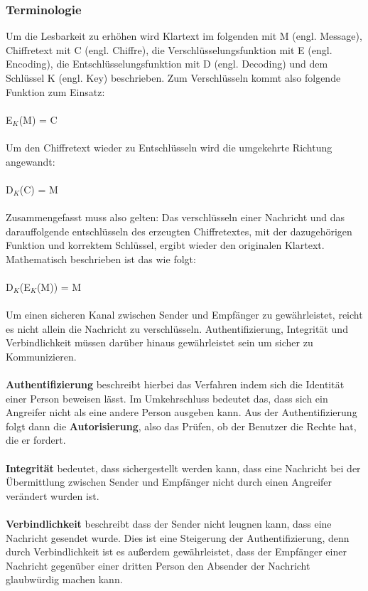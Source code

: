 \documentclass[10pt, a4paper,headsepline]{scrreprt}
\begin{document}
\subsubsection{Terminologie}
Um die Lesbarkeit zu erhöhen wird Klartext im folgenden mit M (engl. Message), Chiffretext mit C (engl. Chiffre), die Verschlüsselungsfunktion mit E (engl. Encoding), die Entschlüsselungsfunktion mit D (engl. Decoding) und dem Schlüssel K (engl. Key) beschrieben.
Zum Verschlüsseln kommt also folgende Funktion zum Einsatz: \\ \\
E$_{K}$(M) = C\\ \\ 
Um den Chiffretext wieder zu Entschlüsseln wird die umgekehrte Richtung angewandt:\\ \\
D$_{K}$(C) = M\\ \\
Zusammengefasst muss also gelten: Das verschlüsseln einer Nachricht und das darauffolgende entschlüsseln des erzeugten Chiffretextes, mit der dazugehörigen Funktion und korrektem Schlüssel, ergibt wieder den originalen Klartext. Mathematisch beschrieben ist das wie folgt:\\ \\
D$_{K}$(E$_{K}$(M)) = M\\ \\
Um einen sicheren Kanal zwischen Sender und Empfänger zu gewährleistet, reicht es nicht allein die Nachricht zu verschlüsseln. Authentifizierung, Integrität und Verbindlichkeit müssen darüber hinaus gewährleistet sein um sicher zu Kommunizieren. \\ \\
\textbf{Authentifizierung} beschreibt hierbei das Verfahren indem sich die Identität einer Person beweisen lässt. Im Umkehrschluss bedeutet das, dass sich ein Angreifer nicht als eine andere Person ausgeben kann. Aus der Authentifizierung folgt dann die \textbf{Autorisierung}, also das Prüfen, ob der Benutzer die Rechte hat, die er fordert.\\ \\
\textbf{Integrität} bedeutet, dass sichergestellt werden kann, dass eine Nachricht bei der Übermittlung zwischen Sender und Empfänger nicht durch einen Angreifer verändert wurden ist. \\ \\
\textbf{Verbindlichkeit} beschreibt  dass der Sender nicht leugnen kann, dass eine Nachricht gesendet wurde. Dies ist eine Steigerung der Authentifizierung, denn durch Verbindlichkeit ist es außerdem gewährleistet, dass der Empfänger einer Nachricht gegenüber einer dritten Person den Absender der Nachricht glaubwürdig machen kann. \citep[S. 1f]{book:angewandte-krypto} \\ \\
\end{document}
